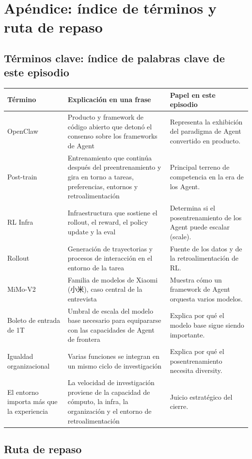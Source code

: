 \section{Apéndice: índice de términos y ruta de repaso}

\subsection{Términos clave: índice de palabras clave de este episodio}

\noindent\begin{longtable}{p{}p{}p{}}
\toprule
Término & Explicación en una frase & Papel en este episodio \\
\midrule
OpenClaw & Producto y framework de código abierto que detonó el consenso sobre los frameworks de Agent & Representa la exhibición del paradigma de Agent convertido en producto. \\
Post-train & Entrenamiento que continúa después del preentrenamiento y gira en torno a tareas, preferencias, entornos y retroalimentación & Principal terreno de competencia en la era de los Agent. \\
RL Infra & Infraestructura que sostiene el rollout, el reward, el policy update y la eval & Determina si el posentrenamiento de los Agent puede escalar (scale). \\
Rollout & Generación de trayectorias y procesos de interacción en el entorno de la tarea & Fuente de los datos y de la retroalimentación de RL. \\
MiMo-V2 & Familia de modelos de Xiaomi (小米), caso central de la entrevista & Muestra cómo un framework de Agent orquesta varios modelos. \\
Boleto de entrada de 1T & Umbral de escala del modelo base necesario para equipararse con las capacidades de Agent de frontera & Explica por qué el modelo base sigue siendo importante. \\
Igualdad organizacional & Varias funciones se integran en un mismo ciclo de investigación & Explica por qué el posentrenamiento necesita diversity. \\
El entorno importa más que la experiencia & La velocidad de investigación proviene de la capacidad de cómputo, la infra, la organización y el entorno de retroalimentación & Juicio estratégico del cierre. \\
\bottomrule
\end{longtable}

\subsection{Ruta de repaso}

